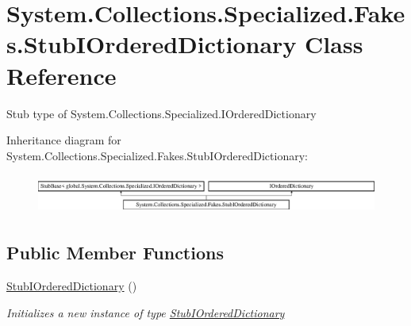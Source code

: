 \hypertarget{class_system_1_1_collections_1_1_specialized_1_1_fakes_1_1_stub_i_ordered_dictionary}{\section{System.\-Collections.\-Specialized.\-Fakes.\-Stub\-I\-Ordered\-Dictionary Class Reference}
\label{class_system_1_1_collections_1_1_specialized_1_1_fakes_1_1_stub_i_ordered_dictionary}
}


Stub type of System.\-Collections.\-Specialized.\-I\-Ordered\-Dictionary 


Inheritance diagram for System.\-Collections.\-Specialized.\-Fakes.\-Stub\-I\-Ordered\-Dictionary\-:\begin{figure}[H]
\begin{center}
\leavevmode
\includegraphics[height=1.323877cm]{class_system_1_1_collections_1_1_specialized_1_1_fakes_1_1_stub_i_ordered_dictionary}
\end{center}
\end{figure}
\subsection*{Public Member Functions}
\begin{DoxyCompactItemize}
\item 
\hyperlink{class_system_1_1_collections_1_1_specialized_1_1_fakes_1_1_stub_i_ordered_dictionary_a625f95c6f3664a928be8a1bd19fd2e9d}{Stub\-I\-Ordered\-Dictionary} ()
\begin{DoxyCompactList}\small\item\em Initializes a new instance of type \hyperlink{class_system_1_1_collections_1_1_specialized_1_1_fakes_1_1_stub_i_ordered_dictionary}{Stub\-I\-Ordered\-Dictionary}\end{DoxyCompactList}\end{DoxyCompactItemize}
